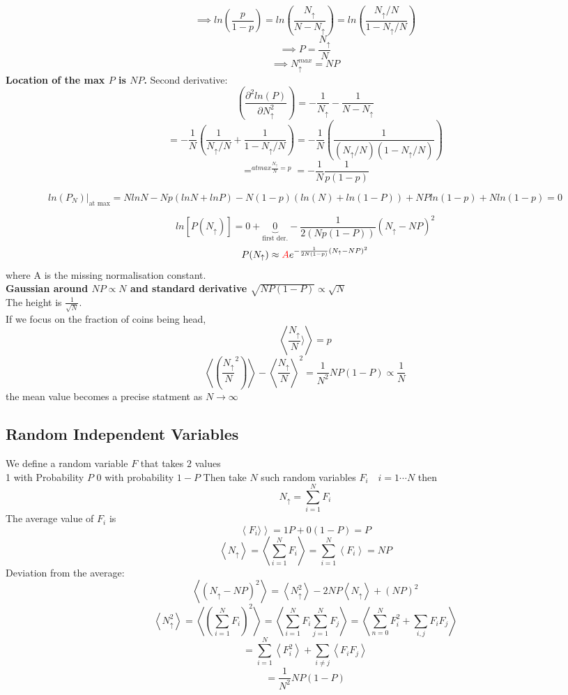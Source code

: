 \documentclass[11pt]{book}
\theoremstyle{definition}
\begin{document}
\[ \implies ln(\frac{p}{1-p}) = ln(\frac{N_\uparrow}{N-N_\uparrow}) = ln\left( \frac{N_\uparrow/N}{1 - N_\uparrow /N} \right) \] 
\[ \implies P = \frac{N_\uparrow}{N} \] 
\[ \implies N_\uparrow^{max} = NP \] 
\textbf{Location of the max $P$ is $ NP $. } 
Second derivative:
\[ \left( \frac{\partial^2 ln(P)}{\partial N_\uparrow^2} \right)  = -\frac{1}{N_\uparrow} - \frac{1}{N-N_\uparrow}\] 
\[ = -\frac{1}{N}(\frac{1}{N_\uparrow/N} + \frac{1}{1-N_\uparrow/N}) = -\frac{1}{N}\left( \frac{1}{(N_\uparrow/N)(1-N_\uparrow/N)} \right) \] 
\[ =^{at max \frac{N_\uparrow}{N} = p} = -\frac{1}{N}\frac{1}{p(1-p)}\] 

\[ ln(P_N)|_{\text{at max}} = NlnN -Np(lnN+lnP) -N(1-p)(ln(N)+ln(1-P)) + NPln(1-p) + Nln(1-p) = 0\] 

\[ ln[P(N_\uparrow)]  = 0 + \underbrace{0}_{\text{first der.}} - \frac{1}{2(Np(1-P))} (N_\uparrow - NP)^2\] 
\[ P(N_\uparrow) \approx {\color{red} A } e^{-\frac{1}{2N(1-p)}(N_\uparrow-NP)^2} \] 
where {\color{red} A} is the missing normalisation constant. \\
\textbf{Gaussian around $ NP \propto N $ and standard derivative $ \sqrt{NP(1-P)} \propto \sqrt{N} $ } \\
The height is $ \frac{1}{\sqrt{N}} $. \\
If we focus on the fraction of coins being head,
\[ \left \langle \frac{N_\uparrow}{N} \rangle \right> = p\] 
\[ \left \langle \left(  \frac{N_\uparrow}{N}^2 \right ) \right \rangle - \left \langle \frac{N_\uparrow}{N} \right \rangle^2 = \frac{1}{N^2} NP(1-P) \propto \frac{1}{N}\] 
the mean value becomes a precise statment as $ N \to \infty $ 
\subsection{Random Independent Variables}
We define a random variable $ F $ that takes $ 2 $ values \\
1 with Probability $ P $ 
0 with probability $ 1-P $ 
Then take $ N $ such random variables $ F_i \quad i = 1 \cdots N $ then
\[ N_\uparrow = \sum_{i=1}^{N} F_i \] 
The average value of $ F_i $ is 
\[ \left \langle F_i \rangle \right> = 1P + 0(1-P)  = P\] 
	\[ \left \langle N_\uparrow \right \rangle = \left \langle \sum_{i=1}^{N}F_i \right \rangle= \sum_{i=1}^{N} \left \langle F_i \right \rangle = NP\] 
Deviation from the average:
\[ \left \langle (N_\uparrow -NP)^2 \right \rangle = \left \langle N_\uparrow^2 \right \rangle - 2NP \left \langle N_\uparrow \right \rangle + (NP)^2\]
		\[ \left \langle N_\uparrow^2 \right \rangle= \left \langle \left( \sum_{i=1}^{N} F_i \right)^2  \right \rangle= \left \langle \sum_{i=1}^{N}F_i \sum_{j=1}^{{N}} F_j\right \rangle = \left \langle \sum_{n=0}^{N} F_i^2 + \sum_{i,j} F_i F_j\right \rangle\] 
\[ = \sum_{i=1}^{N} \left \langle F_i^2 \right \rangle + \sum_{i\neq j} \left \langle F_i F_j \right \rangle \] 
\[ = \frac{1}{N^2}NP(1-P) \] 
\end{document}
